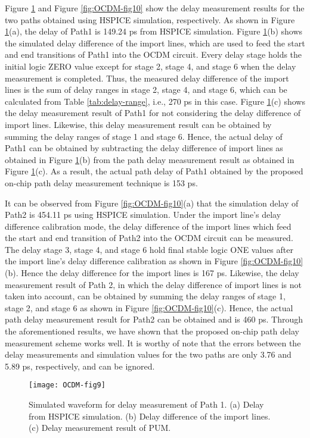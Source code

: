 Figure \ref{fig:OCDM-fig9} and Figure \ref{fig:OCDM-fig10} show the delay measurement results for the two paths obtained using HSPICE simulation, respectively. As shown in Figure \ref{fig:OCDM-fig9}(a), the delay of Path1 is 149.24 ps from HSPICE simulation. Figure \ref{fig:OCDM-fig9}(b) shows the simulated delay difference of the import lines, which are used to feed the start and end transitions of Path1 into the OCDM circuit. Every delay stage holds the initial logic ZERO value except for stage 2, stage 4, and stage 6 when the delay measurement is completed. Thus, the measured delay difference of the import lines is the sum of delay ranges in stage 2, stage 4, and stage 6, which can be calculated from Table \ref{tab:delay-range}, i.e., 270 ps in this case. Figure \ref{fig:OCDM-fig9}(c) shows the delay measurement result of Path1 for not considering the delay difference of import lines. Likewise, this delay measurement result can be obtained by summing the delay ranges of stage 1 and stage 6. Hence, the actual delay of Path1 can be obtained by subtracting the delay difference of import lines as obtained in Figure \ref{fig:OCDM-fig9}(b) from the path delay measurement result as obtained in Figure \ref{fig:OCDM-fig9}(c). As a result, the actual path delay of Path1 obtained by the proposed on-chip path delay measurement technique is 153 ps.

It can be observed from Figure \ref{fig:OCDM-fig10}(a) that the simulation delay of Path2 is 454.11 ps using HSPICE simulation. Under the import line’s delay difference calibration mode, the delay difference of the import lines which feed the start and end transition of Path2 into the OCDM circuit can be measured. The delay stage 3, stage 4, and stage 6 hold final stable logic ONE values after the import line’s delay difference calibration as shown in Figure \ref{fig:OCDM-fig10}(b). Hence the delay difference for the import lines is 167 ps. Likewise, the delay measurement result of Path 2, in which the delay difference of import lines is not taken into account, can be obtained by summing the delay ranges of stage 1, stage 2, and stage 6 as shown in Figure \ref{fig:OCDM-fig10}(c). Hence, the actual path delay measurement result for Path2 can be obtained and is 460 ps. Through the aforementioned results, we have shown that the proposed on-chip path delay measurement scheme works well. It is worthy of note that the errors between the delay measurements and simulation values for the two paths are only 3.76 and 5.89 ps, respectively, and can be ignored.
\begin{figure}[t]
\centering
\texttt{[image: OCDM-fig9]}
    \caption{Simulated waveform for delay measurement of Path 1. (a) Delay from HSPICE simulation. (b) Delay difference of the import lines. (c) Delay measurement result of PUM.}
    \label{fig:OCDM-fig9}
\end{figure}

